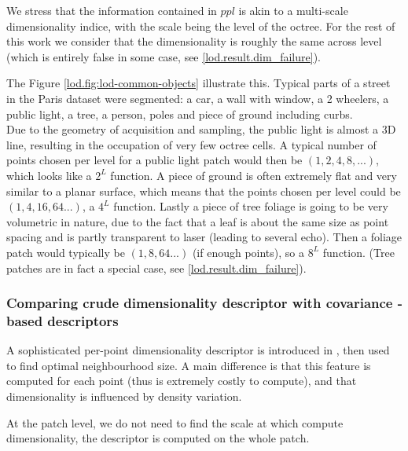 		We stress that the information contained in $ppl$ is akin to a multi-scale dimensionality indice,
		with the scale being the level of the octree.
		For the rest of this work we consider that the dimensionality is roughly the same across level 
		 (which is entirely false in some case, see \ref{lod.result.dim_failure}).
		
		The Figure \ref{lod.fig:lod-common-objects} illustrate this. Typical parts of a street in the Paris dataset were segmented: a car, a wall with window, a 2 wheelers, a public light, a tree, a person, poles and piece of ground including curbs.
		\\
		Due to the geometry of acquisition and sampling, the public light is almost a 3D line, resulting in the occupation of very few octree cells.
		A typical number of points chosen per level for a public light patch would then be $(1,2,4,8,...)$, which looks like a $2^L$ function.
		A piece of ground is often extremely flat and very similar to a planar surface,
		which means that the points chosen per level could be $(1,4,16,64...)$, a $4^L$ function.
		Lastly a piece of tree foliage is going to be very volumetric in nature,
		due to the fact that a leaf is about the same size as point spacing and is partly transparent to laser (leading to several echo).
		Then a foliage patch would typically be $(1,8,64...)$ (if enough points), so a $8^L$ function.
		(Tree patches are in fact a special case, see \ref{lod.result.dim_failure}).
		
				
		\subsubsection{Comparing crude dimensionality descriptor with covariance - based descriptors}
		
		A sophisticated per-point dimensionality descriptor is introduced in \cite{Demantke2014, Weinmann2015}, then used to find optimal neighbourhood size.
		A main difference is that this feature is computed for each point (thus is extremely costly to compute), and that dimensionality is influenced by density variation.
			 
		At the patch level, we do not need to find the scale at which compute dimensionality,	the descriptor is computed on the whole patch.
		
